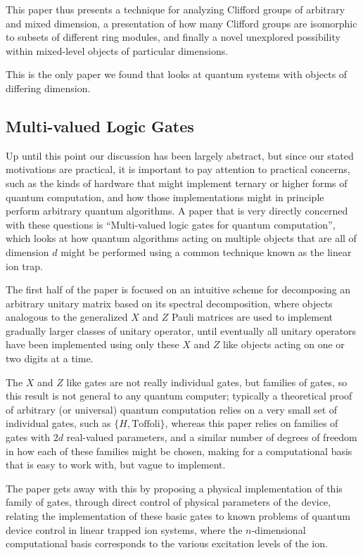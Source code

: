 This paper thus presents a technique for analyzing Clifford groups of arbitrary and mixed dimension, a presentation of how many Clifford groups are isomorphic to subsets of different ring modules, and finally a novel unexplored possibility within mixed-level objects of particular dimensions.

This is the only paper we found that looks at quantum systems with objects of differing dimension.

\subsection{Multi-valued Logic Gates}
Up until this point our discussion has been largely abstract, but since our stated motivations are practical, it is important to pay attention to practical concerns, such as the kinds of hardware that might implement ternary or higher forms of quantum computation, and how those implementations might in principle perform arbitrary quantum algorithms. A paper that is very directly concerned with these questions is ``Multi-valued logic gates for quantum computation''\cite{multi-valued-logic}, which looks at how quantum algorithms acting on multiple objects that are all of dimension $d$ might be performed using a common technique known as the linear ion trap.

The first half of the paper is focused on an intuitive scheme for decomposing an arbitrary unitary matrix based on its spectral decomposition, where objects analogous to the generalized $X$ and $Z$ Pauli matrices are used to implement gradually larger classes of unitary operator, until eventually all unitary operators have been implemented using only these $X$ and $Z$ like objects acting on one or two digits at a time.

The $X$ and $Z$ like gates are not really individual gates, but families of gates, so this result is not general to any quantum computer; typically a theoretical proof of arbitrary (or universal) quantum computation relies on a very small set of individual gates, such as $\{H, \text{Toffoli}\}$, whereas this paper relies on families of gates with $2d$ real-valued parameters, and a similar number of degrees of freedom in how each of these families might be chosen, making for a computational basis that is easy to work with, but vague to implement.

The paper gets away with this by proposing a physical implementation of this family of gates, through direct control of physical parameters of the device, relating the implementation of these basic gates to known problems of quantum device control in linear trapped ion systems, where the $n$-dimensional computational basis corresponds to the various excitation levels of the ion.

